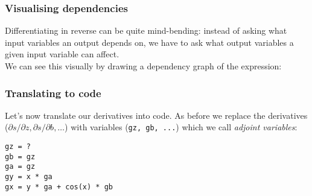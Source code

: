 \documentclass[\beamerclass]{beamer}
\begin{document}
\begin{frame}
\frametitle{Visualising dependencies}

Differentiating in reverse can be quite mind-bending: instead of asking what input variables an output depends on, we have to ask what output variables a given input variable can affect.
\\[1em]
We can see this visually by drawing a dependency graph of the expression: \\[1em]
\begin{center}
\end{center}

\end{frame}

\begin{frame}[fragile]
\frametitle{Translating to code}

Let's now translate our derivatives into code. As before we replace the derivatives ($\partial s/\partial z, \partial s/\partial b, \dots$) with variables (\lstinline!gz, gb, ...!) which we call \emph{adjoint variables}:

\begin{lstlisting}
gz = ?
gb = gz
ga = gz
gy = x * ga
gx = y * ga + cos(x) * gb
\end{lstlisting}


\end{frame}
\end{document}

